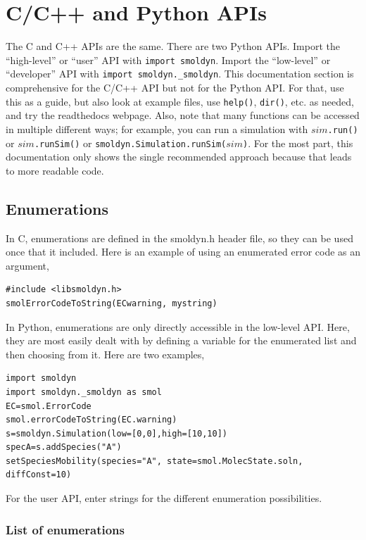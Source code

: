 \documentclass {scrbook}
\newcommand {\ttt} {\texttt}
\begin{document}
\chapter{C/C++ and Python APIs}
\label{ch:APIReference}

The C and C++ APIs are the same. There are two Python APIs. Import the ``high-level'' or ``user'' API with \ttt{import smoldyn}. Import the ``low-level'' or ``developer'' API with \ttt{import smoldyn.\_smoldyn}. This documentation section is comprehensive for the C/C++ API but not for the Python API. For that, use this as a guide, but also look at example files, use \ttt{help()}, \ttt{dir()}, etc. as needed, and try the readthedocs webpage. Also, note that many functions can be accessed in multiple different ways; for example, you can run a simulation with $sim$\ttt{.run()} or $sim$\ttt{.runSim()} or \ttt{smoldyn.Simulation.runSim($sim$)}. For the most part, this documentation only shows the single recommended approach because that leads to more readable code.

\section{Enumerations}

In C, enumerations are defined in the smoldyn.h header file, so they can be used once that it included. Here is an example of using an enumerated error code as an argument,
\begin{lstlisting}[style=SSAC]
#include <libsmoldyn.h>
smolErrorCodeToString(ECwarning, mystring)
\end{lstlisting}

In Python, enumerations are only directly accessible in the low-level API. Here, they are most easily dealt with by defining a variable for the enumerated list and then choosing from it. Here are two examples,
\begin{lstlisting}[style=SSAC]
import smoldyn
import smoldyn._smoldyn as smol
EC=smol.ErrorCode
smol.errorCodeToString(EC.warning)
s=smoldyn.Simulation(low=[0,0],high=[10,10])
specA=s.addSpecies("A")
setSpeciesMobility(species="A", state=smol.MolecState.soln, diffConst=10)
\end{lstlisting}
For the user API, enter strings for the different enumeration possibilities.

\subsection*{List of enumerations}
\end{document}
